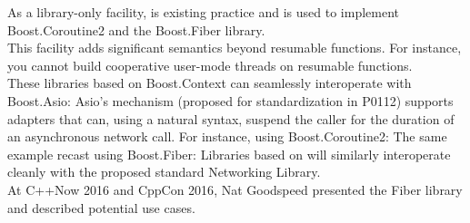 \label{appendixa}
As a library-only facility,
\cite{bcontext} is existing practice
and is used to implement Boost.Coroutine2\cite{bcoroutine2} and the
Boost.Fiber library\cite{bfiber}.\\
\newline
This facility adds significant semantics beyond resumable functions. For
instance, you cannot build cooperative user-mode threads on resumable
functions.\\
\newline
These libraries based on Boost.Context can seamlessly interoperate with
Boost.Asio\cite{basio}: Asio's  mechanism (proposed for
standardization in P0112\cite{P0112}) supports adapters that can, using a
natural syntax, suspend the caller for the duration of an asynchronous network
call. For instance, using Boost.Coroutine2:
The same example recast using Boost.Fiber:
Libraries based on \ectx will similarly interoperate cleanly with the proposed
standard Networking Library\cite{P0112}.\\
\newline
At C++Now 2016\cite{boostcon} and CppCon 2016\cite{cppcon}, Nat Goodspeed
presented the Fiber library and described potential use cases.
